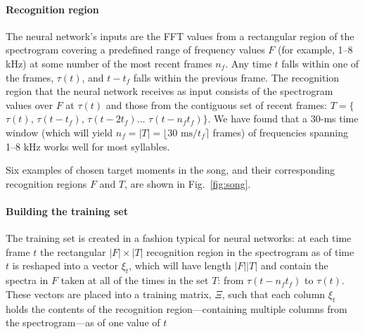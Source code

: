 \documentclass[10pt,letterpaper]{article}
\newcommand\fig[1]{Fig.~\ref{#1}}
\let\oldmarginpar\marginpar
\renewcommand{\marginpar}[1]{\oldmarginpar{\linespread{1}\scriptsize{#1}}}
\renewcommand{\subsubsection}[1]{\paragraph{#1}}
\begin{document}
\subsubsection{Recognition region}


The neural network's inputs are the FFT values from a rectangular
region of the spectrogram covering a predefined range of frequency values $F$ (for example, 1--8 kHz) at
some number of the most recent frames $n_f$.  Any time $t$ falls within one of the frames, $\tau(t)$, and $t-t_f$ falls within the previous frame.  The recognition region that the neural network receives as input consists of the spectrogram values over $F$ at $\tau(t)$ and those from the contiguous set of recent frames: $T = \{$ $\tau(t)$, $\tau(t-t_f)$, $\tau(t-{2t_f})\ldots$ $\tau(t-n_ft_f)\}$.  We have found that a 30-ms time window (which will
yield $n_f = |T|=\lfloor 30\mbox{ ms}/t_f\rceil$ frames) of frequencies
spanning 1--8 kHz works well for most syllables.

Six examples of chosen target moments in the song, and their corresponding recognition regions $F$ and $T$, are shown in \fig{fig:song}.




\subsubsection{Building the training set}

The training set is created in a fashion typical for neural networks:
at each time frame $t$ the rectangular $|F|\times |T|$ recognition
region in the spectrogram as of time $t$ is reshaped into a vector $\xi_t$, which will
have length $|F||T|$ and contain the spectra in $F$ taken at all of the times in the set $T$: from $\tau(t-n_ft_f)$ to $\tau(t)$.  These vectors are placed into a training
matrix, $\Xi$, such that each column $\xi_t$ holds the contents of the
recognition region---containing multiple columns from the spectrogram---as of one value of $t$
\end{document}
